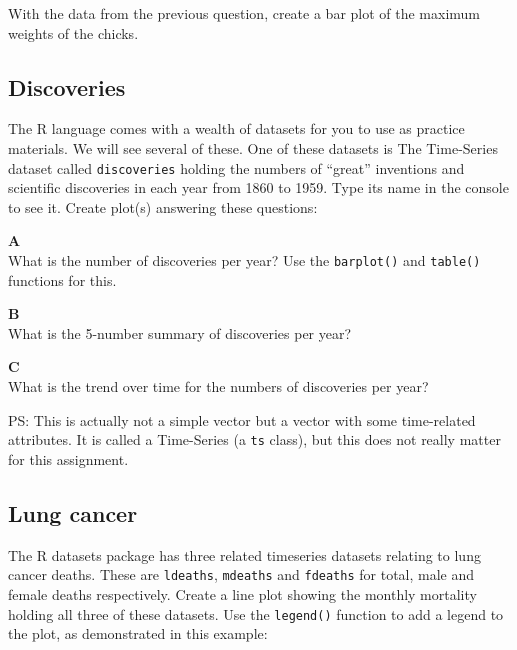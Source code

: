 \documentclass[]{book}
\begin{document}
With the data from the previous question, create a bar plot of the maximum weights of the chicks.

\hypertarget{discoveries}{%
\subsection{Discoveries}\label{discoveries}}

The R language comes with a wealth of datasets for you to use as practice materials. We will see several of these. One of these datasets is The Time-Series dataset called \texttt{discoveries} holding the numbers of ``great'' inventions and scientific discoveries in each year from 1860 to 1959. Type its name in the console to see it. Create plot(s) answering these questions:

\textbf{A}\\
What is the number of discoveries per year? Use the \texttt{barplot()} and \texttt{table()} functions for this.

\textbf{B}\\
What is the 5-number summary of discoveries per year?

\textbf{C}\\
What is the trend over time for the numbers of discoveries per year?

PS: This is actually not a simple vector but a vector with some time-related attributes. It is called a Time-Series (a \texttt{ts} class), but this does not really matter for this assignment.

\hypertarget{lung-cancer}{%
\subsection{Lung cancer}\label{lung-cancer}}

The R datasets package has three related timeseries datasets relating to lung cancer deaths. These are \texttt{ldeaths}, \texttt{mdeaths} and \texttt{fdeaths} for total, male and female deaths respectively. Create a line plot showing the monthly mortality holding all three of these datasets. Use the \texttt{legend()} function to add a legend to the plot, as demonstrated in this example:
\end{document}
